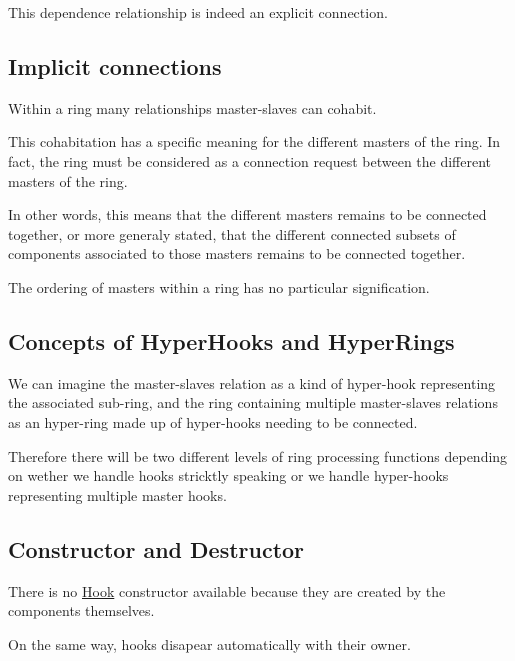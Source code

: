 This dependence relationship is indeed an explicit connection.\hypertarget{classHurricane_1_1Hook_secHookImplicitConnections}{}\subsection{Implicit connections}\label{classHurricane_1_1Hook_secHookImplicitConnections}
Within a ring many relationships master-\/slaves can cohabit.

This cohabitation has a specific meaning for the different masters of the ring. In fact, the ring must be considered as a connection request between the different masters of the ring.

In other words, this means that the different masters remains to be connected together, or more generaly stated, that the different connected subsets of components associated to those masters remains to be connected together.

The ordering of masters within a ring has no particular signification.\hypertarget{classHurricane_1_1Hook_secHookConceptsOfHyperhooksAndHyperrings}{}\subsection{Concepts of Hyper\-Hooks and Hyper\-Rings}\label{classHurricane_1_1Hook_secHookConceptsOfHyperhooksAndHyperrings}
We can imagine the master-\/slaves relation as a kind of hyper-\/hook representing the associated sub-\/ring, and the ring containing multiple master-\/slaves relations as an hyper-\/ring made up of hyper-\/hooks needing to be connected.

Therefore there will be two different levels of ring processing functions depending on wether we handle hooks stricktly speaking or we handle hyper-\/hooks representing multiple master hooks.\hypertarget{classHurricane_1_1Hook_secHookConstructorAndDestructor}{}\subsection{Constructor and Destructor}\label{classHurricane_1_1Hook_secHookConstructorAndDestructor}
There is no \hyperlink{classHurricane_1_1Hook}{Hook} constructor available because they are created by the components themselves.

On the same way, hooks disapear automatically with their owner. 

